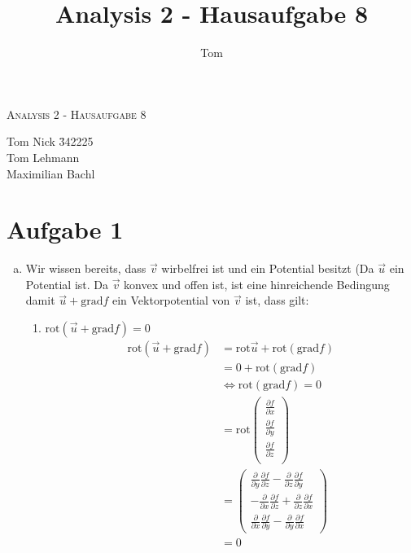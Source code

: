 \documentclass[10pt,a4paper,parskip=half]{scrartcl}
\author{Tom}
\title{Analysis 2 - Hausaufgabe 8}
\newcommand{\vecthree}[3]{\begin{pmatrix}#1\\#2\\#3\\\end {pmatrix}}
\begin{document}
\begin{center}
\textsc{\Large{Analysis 2 - Hausaufgabe 8}} \\
\end{center}
\begin{tabbing}
Tom Nick \hspace{1.4cm}\= 342225\\
Tom Lehmann\\
Maximilian Bachl
\end{tabbing}
\section*{Aufgabe 1}
	\begin{enumerate}[(a)]
\item Wir wissen bereits, dass $\vec{v}$ wirbelfrei ist und ein Potential besitzt (Da $\vec{u}$ ein Potential ist. Da $\vec{v}$ konvex und offen ist, ist eine hinreichende Bedingung damit $\vec{u} + \text{grad} f$ ein Vektorpotential von $\vec{v}$ ist, dass gilt:
\begin{enumerate}[1.]
\item $\text{rot} (\vec{u} + \text{grad} f) = 0 $ \\
\begin{align*}
\text{rot} (\vec{u} + \text{grad} f) &= \text{rot} \vec{u} + \text{rot}(\text{grad} f) \\
&= 0 + \text{rot}(\text{grad} f) \\
&\Leftrightarrow \text{rot}(\text{grad} f) = 0 \\
&=\text{rot}\vecthree{\frac{\partial f}{\partial x}}{\frac{\partial f}{\partial y}}{\frac{\partial f}{\partial z}} \\
&= \begin{pmatrix} \frac{\partial}{\partial y}\frac{\partial f}{\partial z} - \frac{\partial}{\partial z}\frac{\partial f}{\partial y} \\ -\frac{\partial}{\partial x}\frac{\partial f}{\partial z} + \frac{\partial}{\partial z}\frac{\partial f}{\partial x} \\ \frac{\partial}{\partial x}\frac{\partial f}{\partial y} - \frac{\partial}{\partial y}\frac{\partial f}{\partial x}
\end{pmatrix} \\
&= 0
\end{align*}


\end{enumerate}
\end{enumerate}
\end{document}
